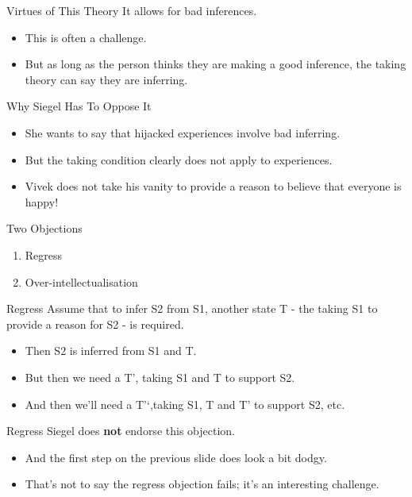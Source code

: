 \documentclass[
  17pt,
  letterpaper,
  ignorenonframetext,
  aspectratio=169,
  handout,
  xcolor={dvipsnames}]{beamer}
\providecommand{\tightlist}{%
  \setlength{\itemsep}{0pt}\setlength{\parskip}{0pt}}\usepackage{longtable,booktabs,array}
\begin{document}
\begin{frame}{Virtues of This Theory}
\protect\hypertarget{virtues-of-this-theory-1}{}
It allows for bad inferences.

\begin{itemize}[<+->]
\tightlist
\item
  This is often a challenge.
\item
  But as long as the person thinks they are making a good inference, the
  taking theory can say they are inferring.
\end{itemize}
\end{frame}

\begin{frame}{Why Siegel Has To Oppose It}
\protect\hypertarget{why-siegel-has-to-oppose-it}{}
\begin{itemize}[<+->]
\tightlist
\item
  She wants to say that hijacked experiences involve bad inferring.
\item
  But the taking condition clearly does not apply to experiences.
\item
  Vivek does not take his vanity to provide a reason to believe that
  everyone is happy!
\end{itemize}
\end{frame}

\begin{frame}{Two Objections}
\protect\hypertarget{two-objections}{}
\begin{enumerate}[<+->]
\tightlist
\item
  Regress
\item
  Over-intellectualisation
\end{enumerate}
\end{frame}

\begin{frame}{Regress}
\protect\hypertarget{regress}{}
Assume that to infer S2 from S1, another state T - the taking S1 to
provide a reason for S2 - is required.

\begin{itemize}[<+->]
\tightlist
\item
  Then S2 is inferred from S1 and T.
\item
  But then we need a T', taking S1 and T to support S2.
\item
  And then we'll need a T'`,taking S1, T and T' to support S2, etc.
\end{itemize}
\end{frame}

\begin{frame}{Regress}
\protect\hypertarget{regress-1}{}
Siegel does \textbf{not} endorse this objection.

\begin{itemize}[<+->]
\tightlist
\item
  And the first step on the previous slide does look a bit dodgy.
\item
  That's not to say the regress objection fails; it's an interesting
  challenge.
\end{itemize}
\end{frame}
\end{document}
